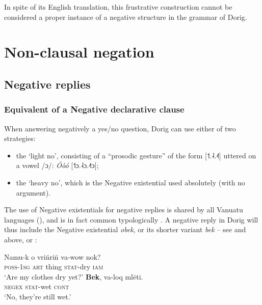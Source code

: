 \documentclass[output=paper,colorlinks,citecolor=brown,draft]{langscibook}
\begin{document}
In spite of its English translation, this frustrative construction cannot be considered a proper instance of a negative structure in the grammar of Dorig.

\section{Non-clausal negation}\label{sec:dor:3}
\subsection{Negative replies}\label{sec:dor:3.1}
\subsubsection{Equivalent of a Negative declarative clause}\label{sec:dor:3.1.1}

When answering negatively a yes/no question, Dorig can use either of two strategies:

\begin{itemize}
    \item the ‘light no’, consisting of a “prosodic gesture” of the form {[{\ToneFont ˦}.{\ToneFont ˨}.{\ToneFont ˨˦}]} %
    utter\-ed on a vowel /ɔ/:  \textit{Óòó} {[{\ToneFont ˦}ɔ.{\ToneFont ˨}ɔ.{\ToneFont ˨˦}ɔ]}; %
    \item the ‘heavy no’, which is the Negative existential used absolutely (with no argument).
\end{itemize}

The use of Negative existentials for negative replies is shared by all Vanuatu languages (\citealt[220]{François2011}), and is in fact common typologically \citep{Veselinova2013neg.exist}.
A negative reply in Dorig will thus include the Negative existential \textit{obek}, or its shorter variant \textit{bek} – see  and  above, or :

\ea\label{ex:dor:stillwet}
    \begin{xlist}
    \label{ex:dor:stillwet1}
        \gll  Namu-k o vri\={n}ri\={n} va-wow nok?\\ 
          \textsc{poss}-\textsc{1sg} \textsc{art} thing \textsc{stat-}dry \textsc{iam}  \\ 
        \glt ‘Are my clothes dry yet?'
    \label{ex:dor:stillwet2}
        \gll \textbf{Bek}, va-loq mlēti. \\ 
           \textsc{negex} \textsc{stat-}wet \textsc{cont}\\
        \glt  ‘No, they’re still wet.’   
    \end{xlist}
\z
\end{document}
